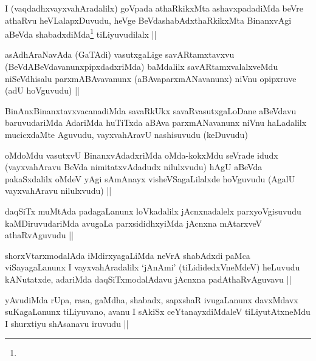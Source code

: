 \begin{artha}
I (vaqdadhxvayxvahAradalilx) goVpada athaRkikxMta ashavxpadadiMda
beVre athaRvu heVLalapxDuvudu, heVge BeVdashabAdxthaRkikxMta
BinanxvAgi aBeVda shabadxdiMda\footnote[1]{} tiLiyuvudilalx ||
\end{artha}


\begin{artha}
asAdhAraNavAda (GaTAdi) vasutxgaLige savARtamxtavxvu
(BeVdABeVdavanunxpipxdadxriMda) baMdalilx savARtamxvalalxveMdu
niSeVdhisalu parxmABAvavanunx (aBAvaparxmANavanunx) niVnu opipxruve
(adU hoVguvudu) || 
\end{artha}

\begin{artha}
BinAnxBinanxtavxvacanadiMda savaRkUkx savaRvasutxgaLoDane aBeVdavu
baruvudariMda AdariMda huTiTxda aBAva parxmANavanunx niVnu haLadalilx
mucicxdaMte Aguvudu, vayxvahAravU nashisuvudu (keDuvudu)
\end{artha}


\begin{artha}
oMdoMdu vasutxvU BinanxvAdadxriMda oMda-kokxMdu seVrade idudx
(vayxvahAravu BeVda nimitatxvAdadudx nilulxvudu) hAgU aBeVda
pakaSxdalilx oMdeV yAgi sAmAnayx visheVSagaLilalxde hoVguvudu (AgalU
vayxvahAravu nilulxvudu) ||
\end{artha}

\begin{artha}
daqSiTx muMtAda padagaLanunx loVkadalilx jAcnxnadalelx parxyoVgisuvudu
kaMDiruvudariMda avugaLa parxsididhxyiMda jAcnxna mAtarxveV
athaRvAguvudu ||
\end{artha}


\begin{artha}
shorxVtarxmodalAda iMdirxyagaLiMda neVrA shabAdxdi paMca
viSayagaLanunx I vayxvahAradalilx `jAnAmi' (tiLididedxVneMdeV)
heLuvudu kANutatxde, adariMda daqSiTxmodalAdavu jAcnxna
padAthaRvAguvavu ||
\end{artha}


\begin{artha}
yAvudiMda rUpa, rasa, gaMdha, shabadx, sapxshaR ivugaLanunx davxMdavx
suKagaLanunx tiLiyuvano, avanu I sAkiSx ceYtanayxdiMdaleV
tiLiyutAtxneMdu I shurxtiyu shAsanavu iruvudu ||
\end{artha}

